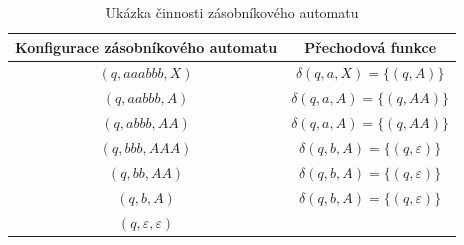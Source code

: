\begin{table}[h]
    \centering
    \begin{tabular}{c|c}
        Konfigurace zásobníkového automatu & Přechodová funkce \\
        \hline
        $(q,aaabbb,X)$ & $\delta(q,a,X) = \{(q,A)\}$ \\
        $(q,aabbb,A)$ & $\delta(q,a,A) = \{(q,AA)\}$ \\
        $(q,abbb,AA)$ & $\delta(q,a,A) = \{(q,AA)\}$ \\
        $(q,bbb,AAA)$ & $\delta(q,b,A) = \{(q,\varepsilon)\}$ \\
        $(q,bb,AA)$ & $\delta(q,b,A) = \{(q,\varepsilon)\}$ \\
        $(q,b,A)$ & $\delta(q,b,A) = \{(q,\varepsilon)\}$ \\
        $(q,\varepsilon,\varepsilon)$ &  \\
    \end{tabular}
    \caption{Ukázka činnosti zásobníkového automatu }\label{tab:DemonstationOfPDA}
\end{table}

\endinput